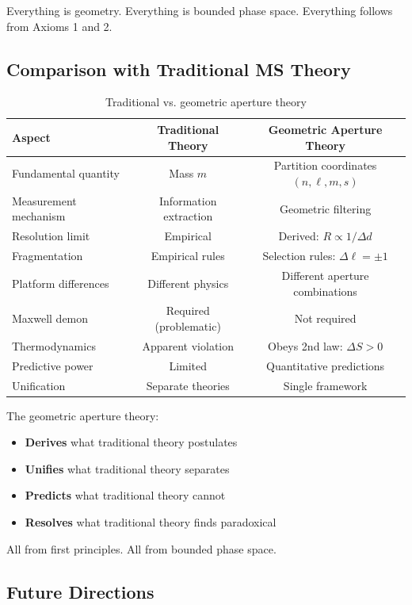 Everything is geometry. Everything is bounded phase space. Everything follows from Axioms 1 and 2.

\subsection{Comparison with Traditional MS Theory}

\begin{table}[h]
\centering
\caption{Traditional vs. geometric aperture theory}
\label{tab:traditional_vs_geometric}
\begin{tabular}{lcc}
\toprule
\textbf{Aspect} & \textbf{Traditional Theory} & \textbf{Geometric Aperture Theory} \\
\midrule
Fundamental quantity & Mass $m$ & Partition coordinates $(n,\ell,m,s)$ \\
Measurement mechanism & Information extraction & Geometric filtering \\
Resolution limit & Empirical & Derived: $R \propto 1/\Delta d$ \\
Fragmentation & Empirical rules & Selection rules: $\Delta\ell = \pm 1$ \\
Platform differences & Different physics & Different aperture combinations \\
Maxwell demon & Required (problematic) & Not required \\
Thermodynamics & Apparent violation & Obeys 2nd law: $\Delta S > 0$ \\
Predictive power & Limited & Quantitative predictions \\
Unification & Separate theories & Single framework \\
\bottomrule
\end{tabular}
\end{table}

The geometric aperture theory:
\begin{itemize}
    \item \textbf{Derives} what traditional theory postulates
    \item \textbf{Unifies} what traditional theory separates
    \item \textbf{Predicts} what traditional theory cannot
    \item \textbf{Resolves} what traditional theory finds paradoxical
\end{itemize}

All from first principles. All from bounded phase space.

\subsection{Future Directions}


